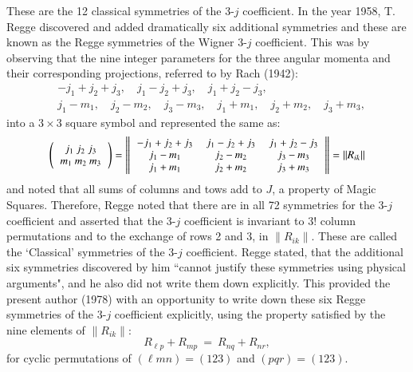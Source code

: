 These are the 12 classical symmetries of the 3-$j$ coefficient. In the year 1958, T. Regge discovered and added dramatically six additional symmetries and these are known as the Regge symmetries of the Wigner 3-$j$ coefficient. This was by observing that the nine integer parameters for the three angular momenta and their corresponding projections, referred to by Rach (1942):
\begin{equation}
\begin{split}
& -j_1+j_2+j_3, \quad  j_1-j_2+j_3, \quad j_1+j_2-j_3,\\
& j_1-m_1,\quad j_2-m_2,\quad j_3-m_3,\quad j_1+m_1,\quad j_2+m_2,\quad j_3+m_3,\label{chap7-eq10}
\end{split}
\end{equation}
into a $3\times 3$ square symbol and represented the same as:
{\begin{equation}\fontsize{9.5pt}{11pt}\selectfont
\left(
\begin{tabular}{ccc}
$j_1\ j_2\ j_3$\\ 
$m_1\ m_2\ m_3$\\ 
\end{tabular} 
\right) 
= \left\| 
\begin{tabular}{ccc}
$-j_1+j_2+j_3$ & $j_1-j_2+j_3$ &  $j_1+j_2-j_3$\\
$j_1-m_1$ & $j_2-m_2$ & $j_3-m_3$\\
$j_1+m_1$ & $j_2+m_2$ & $j_3+m_3$\\
\end{tabular} 
\right\|
=\|R_{ik}\| \label{chap7-eq11}
\end{equation}}\relax
and noted that all sums of columns and tows add to $J$, a property of Magic Squares. Therefore, Regge noted that there are in all 72 symmetries for the 3-$j$ coefficient and asserted that the 3-$j$ coefficient is invariant to 3! column permutations and to the exchange of rows 2 and 3, in $\|R_{ik}\|$. These are called the `Classical' symmetries of the 3-$j$ coefficient. Regge stated, that the additional six symmetries discovered by him ``cannot justify these symmetries using physical arguments", and he also did not write them down explicitly. This provided the present author (1978) with an opportunity to write down these six Regge symmetries of the 3-$j$ coefficient explicitly, using the property satisfied by the nine elements of $\|R_{ik}\|$:
\begin{equation}
R_{\ell p} + R_{mp}\ =\ R_{nq} + R_{nr},\label{chap7-eq12}
\end{equation}
for cyclic permutations of $(\ell mn)=(123)$ and $(pqr)=(123)$. 

